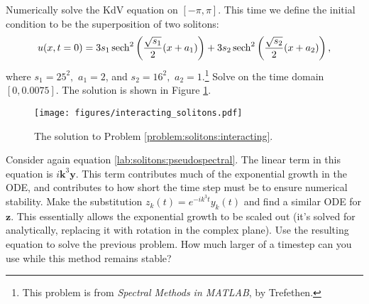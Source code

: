 \begin{problem}
Numerically solve the KdV equation on $[-\pi,\pi]$.
This time we define the initial condition
to be the superposition of two solitons:
\[
u(x,t=0) = 3s_1\operatorname{sech}^2\left(\frac{\sqrt{s_1}}{2}(x+a_1)\right) + 3s_2\operatorname{sech}^2\left(\frac{\sqrt{s_2}}{2}(x+a_2)\right),
\]
where $s_1 = 25^2,$ $a_1 = 2$, and $s_2 = 16^2,$ $a_2 = 1$.\footnote{This problem is from \textit{Spectral Methods in MATLAB}, by Trefethen.}
Solve on the time domain $[0,0.0075]$.
The solution is shown in Figure \ref{fig:solitons:interacting}.
\label{problem:solitons:interacting}
\end{problem}

\begin{figure}[H]
\centering
\texttt{[image: figures/interacting\_solitons.pdf]}
\caption{The solution to Problem \ref{problem:solitons:interacting}.}
\label{fig:solitons:interacting}
\end{figure}

\begin{problem}
Consider again equation \eqref{lab:solitons:pseudospectral}.
The linear term in this equation is $i\mathbf{k}^3\mathbf{y}$.
This term contributes much of the exponential growth in the ODE, and contributes to how short the time step must be to ensure numerical stability.
Make the substitution $z_k(t) = e^{-ik^3t}y_k(t)$ and find a similar ODE for $\mathbf{z}$.
This essentially allows the exponential growth to be scaled out (it's solved for analytically, replacing it with rotation in the complex plane).
Use the resulting equation to solve the previous problem.
How much larger of a timestep can you use while this method remains stable?
\end{problem}
